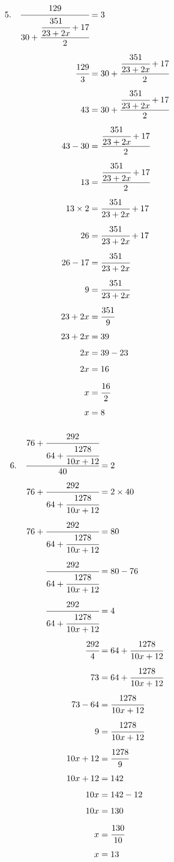 \documentclass{article}
\begin{document}
\noindent
\begin{minipage}[t]{0.5000\textwidth}
\begin{align*}
5.\hspace{10pt}\cfrac{129}{30+\cfrac{\cfrac{351}{23+2x}+17}{2}}&=3\\[4pt]
\cfrac{129}{3}&=30+\cfrac{\cfrac{351}{23+2x}+17}{2}\\[4pt]
43&=30+\cfrac{\cfrac{351}{23+2x}+17}{2}\\[4pt]
43-30&=\cfrac{\cfrac{351}{23+2x}+17}{2}\\[4pt]
13&=\cfrac{\cfrac{351}{23+2x}+17}{2}\\[4pt]
13\times2&=\cfrac{351}{23+2x}+17\\[4pt]
26&=\cfrac{351}{23+2x}+17\\[4pt]
26-17&=\cfrac{351}{23+2x}\\[4pt]
9&=\cfrac{351}{23+2x}\\[4pt]
23+2x&=\cfrac{351}{9}\\[4pt]
23+2x&=39\\[4pt]
2x&=39-23\\[4pt]
2x&=16\\[4pt]
x&=\cfrac{16}{2}\\[4pt]
x&=8\\[4pt]
\end{align*}
\end{minipage}
\begin{minipage}[t]{0.5000\textwidth}
\begin{align*}
6.\hspace{10pt}\cfrac{76+\cfrac{292}{64+\cfrac{1278}{10x+12}}}{40}&=2\\[4pt]
76+\cfrac{292}{64+\cfrac{1278}{10x+12}}&=2\times40\\[4pt]
76+\cfrac{292}{64+\cfrac{1278}{10x+12}}&=80\\[4pt]
\cfrac{292}{64+\cfrac{1278}{10x+12}}&=80-76\\[4pt]
\cfrac{292}{64+\cfrac{1278}{10x+12}}&=4\\[4pt]
\cfrac{292}{4}&=64+\cfrac{1278}{10x+12}\\[4pt]
73&=64+\cfrac{1278}{10x+12}\\[4pt]
73-64&=\cfrac{1278}{10x+12}\\[4pt]
9&=\cfrac{1278}{10x+12}\\[4pt]
10x+12&=\cfrac{1278}{9}\\[4pt]
10x+12&=142\\[4pt]
10x&=142-12\\[4pt]
10x&=130\\[4pt]
x&=\cfrac{130}{10}\\[4pt]
x&=13\\[4pt]
\end{align*}
\end{minipage}
\vspace{10 mm}
\end{document}
